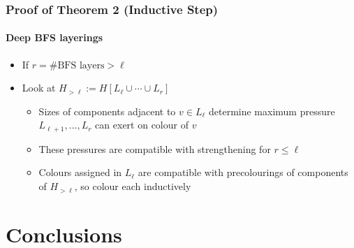 \documentclass[xcolor=dvipsnames]{beamer}
\begin{document}
\begin{frame}
  \frametitle{Proof of Theorem 2 (Inductive Step)}
  \framesubtitle{Deep BFS layerings}

  \begin{itemize}
    \item If $r=\text{\# BFS layers}>\ell$
    \item Look at $H_{> \ell}:=H[L_\ell\cup\cdots\cup L_r]$
    \begin{itemize}
      \item<2-> Sizes of components adjacent to $v\in L_\ell$ determine maximum pressure $L_{\ell+1},\ldots,L_r$ can exert on colour of $v$
      \item<3-> These pressures are compatible with strengthening for $r\le\ell$
      \item<4-> Colours assigned in $L_{\ell}$ are compatible with precolourings
      of components of $H_{>\ell}$, so colour each inductively
    \end{itemize}
    \end{itemize}
    \begin{center}
    \end{center}
\end{frame}

\section{Conclusions}
\end{document}
